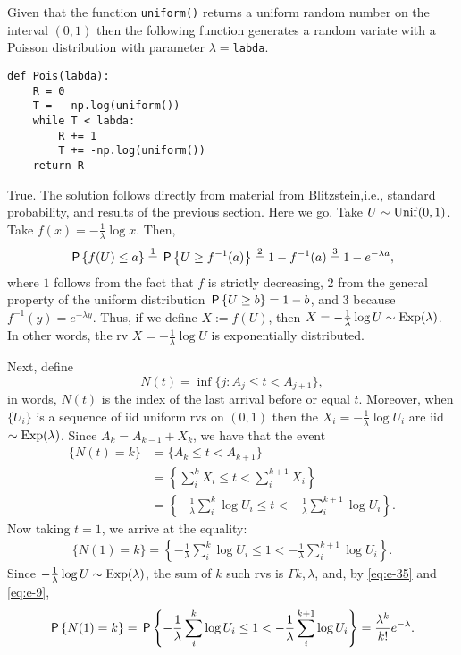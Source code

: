 \documentclass[stochastic-or.tex]{subfiles}
\begin{document}
\begin{truefalse}
    Given that the function \texttt{uniform()} returns a uniform random number on the interval $(0, 1)$ then the following function generates a random variate with a Poisson distribution with parameter $\lambda=$\texttt{labda}.
\begin{verbatim}
def Pois(labda):
    R = 0
    T = - np.log(uniform())
    while T < labda:
        R += 1
        T += -np.log(uniform())
    return R
\end{verbatim}
\begin{solution}
True.
The solution follows directly from material from Blitzstein,i.e., standard  probability, and results of the previous section.
Here we go.
Take  $U \sim \Unif{(0,1)}$. Take $f(x) = -\frac{1}{\lambda}\log x$.
Then,
\begin{equation*}
\P{f(U) \leq a} \stackrel1= \P{U \geq f^{-1}(a)} \stackrel2= 1- f^{-1}(a) \stackrel3= 1- e^{-\lambda a},
\end{equation*}
where $1$ follows from the fact that $f$ is strictly decreasing, 2 from the general property of the uniform distribution $\P{U\geq b} = 1 - b$, and $3$ because $f^{-1}(y) = e^{-\lambda y}$.
Thus,  if we define $X:=f(U)$, then $X = -\frac{1}{\lambda}\log U \sim \Exp{\lambda}$. In other words, the rv $X=-\frac{1}{\lambda} \log U$ is exponentially distributed.

Next, define
\begin{equation*}
N(t) = \inf\{j : A_{j} \leq t < A_{j+1}\},
\end{equation*}
in words, $N(t)$ is the index of the last arrival before or equal $t$.
Moreover, when $\{U_{i}\}$ is a sequence of iid uniform rvs on $(0,1)$ then the $X_{i} = -\frac{1}{\lambda} \log U_{i}$ are iid $\sim \Exp{\lambda}$.
Since $A_{k} = A_{k-1} + X_{k}$, we have that the event
\begin{align*}
  \{N(t) = k \}
  &= \{A_k \leq t < A_{k+1}\} \\
  &= \left\{\sum_{i}^{k} X_{i}\leq t < \sum_{i}^{k+1} X_{i}\right\} \\
  &= \left\{-\frac{1}{\lambda}\sum_{i}^{k} \log U_{i}\leq t < -\frac{1}{\lambda}\sum_{i}^{k+1} \log U_{i}\right\}.
\end{align*}
Now taking $t=1$, we arrive at the equality:
\begin{align*}
  \{N(1) = k \} = \left\{-\frac{1}{\lambda}\sum_{i}^{k} \log U_{i}\leq 1 < -\frac{1}{\lambda}\sum_{i}^{k+1} \log U_{i}\right\}.
\end{align*}
Since $-\frac{1}{\lambda}\log U\sim \Exp{\lambda}$, the sum of $k$ such rvs is $\Gamma{k, \lambda}$, and, by \cref{eq:e-35} and \cref{eq:e-9},
\begin{align*}
  \P{N(1) = k} = \P{-\frac{1}{\lambda}\sum_{i}^{k} \log U_{i}\leq 1 < -\frac{1}{\lambda}\sum_{i}^{k+1} \log U_{i}} = \frac{\lambda^{k}}{k!} e^{-\lambda}.
\end{align*}



\end{solution}
\end{truefalse}
\end{document}
